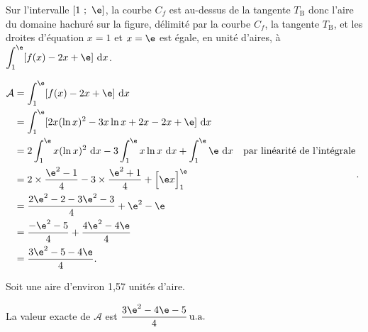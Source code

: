 \begin{enumerate}
	Sur l'intervalle  $[1~;~\e]$, la courbe $C_{f}$ est au-dessus de la tangente $T_{\mathrm{B}}$ donc  l'aire du domaine hachuré sur la figure, délimité par la courbe $C_{f}$, la tangente $T_{\mathrm{B}}$, et les droites d'équation $x=1$ et $x= \e$ est égale, en unité d'aires,  à $\displaystyle \int_{1}^{\e} [f(x)-2x+\e ]~\mathrm{d} x$.

	$\begin{aligned}  \mathcal{A} &= \int_{1}^{\e} [f(x)-2x+\e] ~\mathrm{d} x\\
		&= \int_{1}^{\e} [2x(\ln x)^{2}-3x \ln x+2x -2x+\e] ~\mathrm{d} x\\
		&= 2\int_{1}^{\e} x(\ln x)^{2} ~\mathrm{d} x-3 \int_{1}^{\e} x \ln x ~\mathrm{d} x+ \int_{1}^{\e} \e  ~\mathrm{d} x \quad \text {par linéarité de l'intégrale}\\
		&= 2 \times \dfrac{\e^{2}-1}{4} - 3 \times \dfrac{\e^{2}+1}{4} + \Big[ \e x\Big]_1^{\e}\\
		&= \dfrac{2\e^2-2-3\e^2-3}{4} + \e^2-\e \\
		&= \dfrac{-\e^2-5}{4} +\dfrac{ 4\e^2-4\e}{4} \\
		&= \dfrac{3\e^2-5-4\e}{4}.\\
	\end{aligned}$.

Soit une aire d'environ 1,57 unités d'aire.

La valeur exacte de $\mathcal{A}$ est $\dfrac{3\e^2-4\e -5}{4} \,\rm{u.a.}$
\end{enumerate}

\medskip
